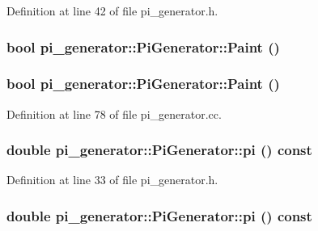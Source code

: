 Definition at line 42 of file pi\_\-generator.h.

\hypertarget{classpi__generator_1_1_pi_generator_a47540afa1d21ef0b6e6ea7d986b71243}{
\subsubsection[{Paint}]{\setlength{\rightskip}{0pt plus 5cm}bool pi\_\-generator::PiGenerator::Paint ()}}
\label{classpi__generator_1_1_pi_generator_a47540afa1d21ef0b6e6ea7d986b71243}
\hypertarget{classpi__generator_1_1_pi_generator_a47540afa1d21ef0b6e6ea7d986b71243}{
\subsubsection[{Paint}]{\setlength{\rightskip}{0pt plus 5cm}bool pi\_\-generator::PiGenerator::Paint ()}}
\label{classpi__generator_1_1_pi_generator_a47540afa1d21ef0b6e6ea7d986b71243}


Definition at line 78 of file pi\_\-generator.cc.

\hypertarget{classpi__generator_1_1_pi_generator_a74119d27c1a01b50b91677f8089a0103}{
\subsubsection[{pi}]{\setlength{\rightskip}{0pt plus 5cm}double pi\_\-generator::PiGenerator::pi () const}}
\label{classpi__generator_1_1_pi_generator_a74119d27c1a01b50b91677f8089a0103}


Definition at line 33 of file pi\_\-generator.h.

\hypertarget{classpi__generator_1_1_pi_generator_a74119d27c1a01b50b91677f8089a0103}{
\subsubsection[{pi}]{\setlength{\rightskip}{0pt plus 5cm}double pi\_\-generator::PiGenerator::pi () const}}
\label{classpi__generator_1_1_pi_generator_a74119d27c1a01b50b91677f8089a0103}


